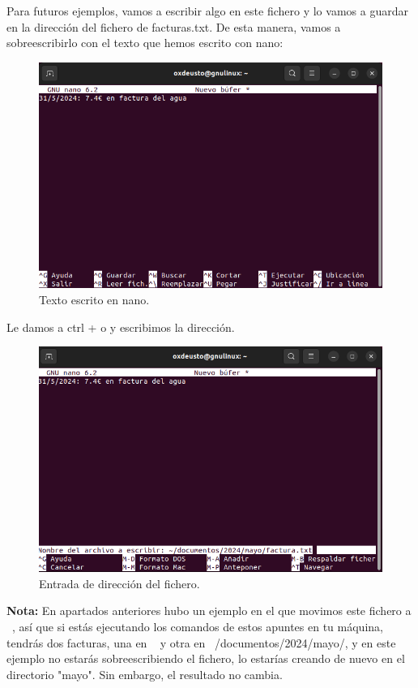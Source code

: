 Para futuros ejemplos, vamos a escribir algo en este fichero y lo vamos a guardar en la dirección del fichero de facturas.txt. De esta manera, vamos a sobreescribirlo con el texto que hemos escrito con nano:

\begin{figure}[H]
    \centering
    \includegraphics[width=0.80\linewidth]{resources/images/nano_2.png}
    \caption{Texto escrito en nano.}
\end{figure}

Le damos a ctrl + o y escribimos la dirección.

\begin{figure}[H]
    \centering
    \includegraphics[width=0.75\linewidth]{resources/images/nano_3.png}
    \caption{Entrada de dirección del fichero.}
\end{figure}

\textbf{Nota:} En apartados anteriores hubo un ejemplo en el que movimos este fichero a ~, así que si estás ejecutando los comandos de estos apuntes en tu máquina, tendrás dos facturas, una en ~ y otra en ~/documentos/2024/mayo/, y en este ejemplo no estarás sobreescribiendo el fichero, lo estarías creando de nuevo en el directorio "mayo". Sin embargo, el resultado no cambia.

